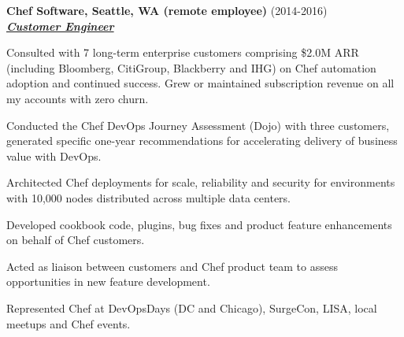 \documentclass{article}
\newcommand{\employer}[3]{{ \textbf{#1} (#2)\\ \underline{\textbf{\emph{#3}}}\\ \nopagebreak }}
\newenvironment{achievements}{\begin{list}{\topsep 0pt \itemsep -2pt}} {\vspace*{4pt}\end{list}}
\begin{document}
\employer{Chef Software, Seattle, WA (remote employee)}{2014-2016}{Customer Engineer}
\begin{achievements}
  \item Consulted with 7 long-term enterprise customers comprising \$2.0M ARR (including Bloomberg, CitiGroup, Blackberry and IHG) on Chef automation adoption and continued success. Grew or maintained subscription revenue on all my accounts with zero churn.
  \item Conducted the Chef DevOps Journey Assessment (Dojo) with three customers, generated specific one-year recommendations for accelerating delivery of business value with DevOps.
  \item Architected Chef deployments for scale, reliability and security for environments with 10,000 nodes distributed across multiple data centers.
  \item Developed cookbook code, plugins, bug fixes and product feature enhancements on behalf of Chef customers.
  \item Acted as liaison between customers and Chef product team to assess opportunities in new feature development.
  \item Represented Chef at DevOpsDays (DC and Chicago), SurgeCon, LISA, local meetups and Chef events.
\end{achievements}
\end{document}
